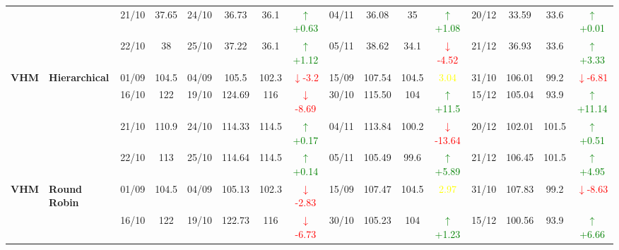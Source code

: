 \documentclass{ieeeaccess}
\begin{document}
{\begin{longtable}{llcc|cccc|cccc|cccc}
&
& 21/10 & 37.65 & 24/10 & 36.73 & 36.1 & \textcolor{green}{\(\uparrow\)+0.63} & 04/11 & 36.08 & 35 & \textcolor{green}{\(\uparrow\)+1.08} & 20/12 & 33.59 & 33.6 &\textcolor{green}{\(\uparrow\)+0.01}\\

&
& 22/10 & 38 & 25/10 & 37.22 & 36.1 & \textcolor{green}{\(\uparrow\)+1.12} & 05/11 & 38.62 & 34.1 & \textcolor{red}{\(\downarrow\)-4.52} & 21/12 & 36.93 & 33.6 & \textcolor{green}{\(\uparrow\)+3.33} \\
\midrule




\multirow{4}{*}{\textbf{VHM}} 
& \textbf{Hierarchical}
& 01/09 & 104.5 & 04/09 & 105.5 & 102.3 & \textcolor{red}{\(\downarrow\)-3.2} & 15/09 & 107.54 & 104.5 & \textcolor{yellow}{3.04} & 31/10 & 106.01 & 99.2 & \textcolor{red}{\(\downarrow\)-6.81} \\

&
& 16/10 & 122 & 19/10 & 124.69 & 116 & \textcolor{red}{\(\downarrow\)-8.69} & 30/10 & 115.50 & 104 & \textcolor{green}{\(\uparrow\)+11.5} & 15/12 & 105.04 & 93.9 & \textcolor{green}{\(\uparrow\)+11.14} \\

&
& 21/10 & 110.9 & 24/10 & 114.33 & 114.5 & \textcolor{green}{\(\uparrow\)+0.17} & 04/11 & 113.84 & 100.2 & \textcolor{red}{\(\downarrow\)-13.64} & 20/12 & 102.01 & 101.5 & \textcolor{green}{\(\uparrow\)+0.51} \\

&
& 22/10 & 113 & 25/10 & 114.64 & 114.5 & \textcolor{green}{\(\uparrow\)+0.14} & 05/11 & 105.49 & 99.6 & \textcolor{green}{\(\uparrow\)+5.89} & 21/12 & 106.45 & 101.5 & \textcolor{green}{\(\uparrow\)+4.95} \\
\midrule


\multirow{4}{*}{\textbf{VHM}} 
& \textbf{Round Robin}
& 01/09 & 104.5 & 04/09 & 105.13 & 102.3 & \textcolor{red}{\(\downarrow\)-2.83} & 15/09 & 107.47 & 104.5 & \textcolor{yellow}{2.97} & 31/10 & 107.83 & 99.2 & \textcolor{red}{\(\downarrow\)-8.63} \\

&
& 16/10 & 122 & 19/10 & 122.73 & 116 & \textcolor{red}{\(\downarrow\)-6.73} & 30/10 & 105.23 & 104 & \textcolor{green}{\(\uparrow\)+1.23} & 15/12 & 100.56 & 93.9 & \textcolor{green}{\(\uparrow\)+6.66} \\


\end{longtable}}
\end{document}
